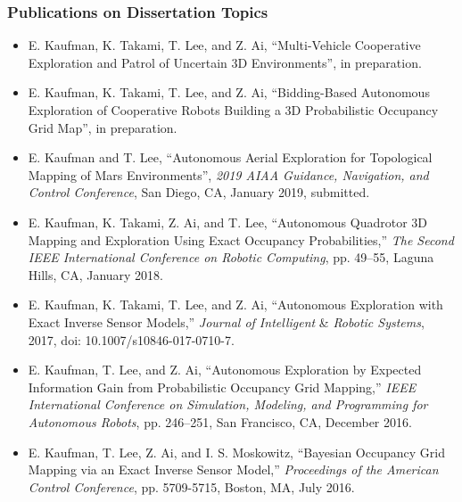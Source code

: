 \documentclass[11pt,professionalfonts,hyperref={pdftex,pdfpagemode=none,pdfstartview=FitH}]{beamer}
\begin{document}
\begin{frame}
\frametitle{Publications on Dissertation Topics}
{\tiny 
\begin{itemize}
	\item E. Kaufman, K. Takami, T. Lee, and Z. Ai, ``Multi-Vehicle Cooperative Exploration and Patrol of Uncertain 3D Environments'', in preparation.
	\item E. Kaufman, K. Takami, T. Lee, and Z. Ai, ``Bidding-Based Autonomous Exploration of Cooperative Robots Building a 3D Probabilistic Occupancy Grid Map'', in preparation.
	\item E. Kaufman and T. Lee, ``Autonomous Aerial Exploration for Topological Mapping of Mars Environments'', \textit{2019 AIAA Guidance, Navigation, and Control Conference}, San Diego, CA, January 2019, submitted.
	\item E. Kaufman, K. Takami, Z. Ai, and T. Lee, ``Autonomous Quadrotor 3D Mapping and Exploration Using Exact Occupancy Probabilities,'' \textit{The Second IEEE International Conference on Robotic Computing}, pp. 49--55, Laguna Hills, CA, January 2018.
	\item E. Kaufman, K. Takami, T. Lee, and Z. Ai, ``Autonomous Exploration with Exact Inverse Sensor Models,'' \textit{Journal of Intelligent }\&\textit{ Robotic Systems}, 2017, doi: 10.1007/s10846-017-0710-7.
	\item E. Kaufman, T. Lee, and Z. Ai, ``Autonomous Exploration by Expected Information Gain from Probabilistic Occupancy Grid Mapping,'' \textit{IEEE International Conference on Simulation, Modeling, and Programming for Autonomous Robots}, pp. 246--251, San Francisco, CA, December 2016.
	\item E. Kaufman, T. Lee, Z. Ai, and I. S. Moskowitz, ``Bayesian Occupancy Grid Mapping via an Exact Inverse Sensor Model,'' \textit{Proceedings of the American Control Conference}, pp. 5709-5715, Boston, MA, July 2016.
\end{itemize}
}
\end{frame}
\end{document}
